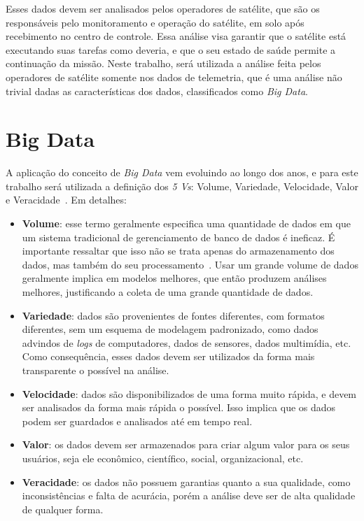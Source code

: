 Esses dados devem ser analisados pelos operadores de satélite, que são os responsáveis pelo monitoramento e operação do satélite, em solo após recebimento no centro de controle.
Essa análise visa garantir que o satélite está executando suas tarefas como deveria, e que o seu estado de saúde permite a continuação da missão.
{\color{cerulean}
Neste trabalho, será utilizada a análise feita pelos operadores de satélite somente nos dados de telemetria, que é uma análise não trivial dadas as características dos dados, classificados como \textit{Big Data}.
}

\section{Big Data}\label{ch:fun:bigdata}

A aplicação do conceito de \textit{Big Data} vem evoluindo ao longo dos anos, e para este trabalho será utilizada a definição dos \textit{5 Vs}: Volume, Variedade, Velocidade, Valor e Veracidade~\cite{kacfahemaniUnderstandableBigData2015}. Em detalhes:

\begin{itemize}
	\item \textbf{Volume}: esse termo geralmente especifica uma quantidade de dados em que um sistema tradicional de gerenciamento de banco de dados é ineficaz.
É importante ressaltar que isso não se trata apenas do armazenamento dos dados, mas também do seu processamento~\cite{boussoufBigDataBased2018}.
Usar um grande volume de dados geralmente implica em modelos melhores, que então produzem análises melhores, justificando a coleta de uma grande quantidade de dados.
	\item \textbf{Variedade}: dados são provenientes de fontes diferentes, com formatos diferentes, sem um esquema de modelagem padronizado, como dados advindos de \textit{logs} de computadores, dados de sensores, dados multimídia, etc.
Como consequência, esses dados devem ser utilizados da forma mais transparente o possível na análise.
	\item \textbf{Velocidade}: dados são disponibilizados de uma forma muito rápida, e devem ser analisados da forma mais rápida o possível.
Isso implica que os dados podem ser guardados e analisados até em tempo real.
	\item \textbf{Valor}: os dados devem ser armazenados para criar algum valor para os seus usuários, seja ele econômico, científico, social, organizacional, etc.
	\item \textbf{Veracidade}: os dados não possuem garantias quanto a sua qualidade, como inconsistências e falta de acurácia, porém a análise deve ser de alta qualidade de qualquer forma.
\end{itemize}


